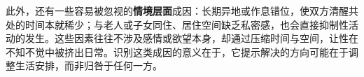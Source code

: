 此外，还有一些容易被忽视的\textbf{情境层面}成因：长期异地或作息错位，使双方清醒共处的时间本就稀少；与老人或子女同住、居住空间缺乏私密感，也会直接抑制性活动的发生。这些因素往往不涉及感情或欲望本身，却通过压缩时间与空间，让性在不知不觉中被挤出日常。识别这类成因的意义在于，它提示解决的方向可能在于调整生活安排，而非归咎于任何一方。
